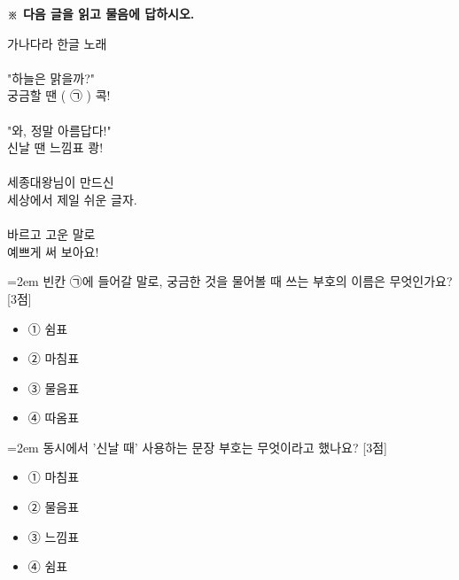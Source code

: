 \documentclass[12pt,a4paper]{article}
\newcommand{\qnum}[1]{%
  \tikz[baseline=(num.base)]{%
    \node[circle, fill=numCircle, text=white, inner sep=0pt,
          minimum size=18pt, font=\small\bfseries] (num) {#1};%
  }%
}
\newcommand{\pts}[1]{%
  \hfill\textcolor{ptsBadge}{[#1점]}%
}
\begin{document}
\vspace{4mm}
{\small\textbf{※ 다음 글을 읽고 물음에 답하시오.}}
\vspace{2mm}
\begin{tcolorbox}[passage]
가나다라 한글 노래 \\{}
\vspace{4pt} \\{}
"하늘은 맑을까?" \\{}
궁금할 땐 ( ㉠ ) 콕! \\{}
\vspace{4pt} \\{}
"와, 정말 아름답다!" \\{}
신날 땐 느낌표 쾅! \\{}
\vspace{4pt} \\{}
세종대왕님이 만드신 \\{}
세상에서 제일 쉬운 글자. \\{}
\vspace{4pt} \\{}
바르고 고운 말로 \\{}
예쁘게 써 보아요!
\end{tcolorbox}
\vspace{3mm}
\begin{samepage}
{\hangindent=2em
\qnum{3}\enspace 빈칸 ㉠에 들어갈 말로, 궁금한 것을 물어볼 때 쓰는 부호의 이름은 무엇인가요? \pts{3}
\par}

\vspace{3mm}
\begin{itemize}[leftmargin=2.5em, labelsep=0.3em, label={}, itemsep=4pt, parsep=1pt, topsep=0pt]
  \item ① 쉼표
  \item ② 마침표
  \item ③ 물음표
  \item ④ 따옴표
\end{itemize}
\end{samepage}

\vspace{4mm}
\begin{samepage}
{\hangindent=2em
\qnum{4}\enspace 동시에서 '신날 때' 사용하는 문장 부호는 무엇이라고 했나요? \pts{3}
\par}

\vspace{3mm}
\begin{itemize}[leftmargin=2.5em, labelsep=0.3em, label={}, itemsep=4pt, parsep=1pt, topsep=0pt]
  \item ① 마침표
  \item ② 물음표
  \item ③ 느낌표
  \item ④ 쉼표
\end{itemize}
\end{samepage}
\end{document}

